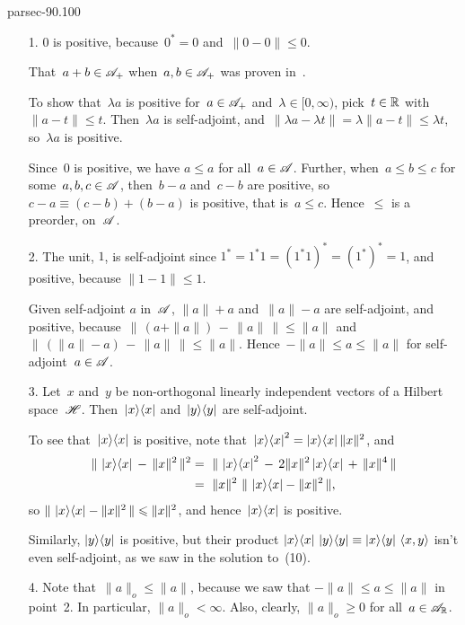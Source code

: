 \documentclass[b5page]{book}
\begin{document}
\begin{solution}{parsec-90.100}
\begin{enumerate}
\item[1.]
$0$ is positive, because~$0^*=0$ and~$\|0-0\|\leq 0$.

That~$a+b\in\mathscr{A}_+$ when~$a,b\in\mathscr{A}_+$
was proven in~.

To show that~$\lambda a$ is positive
for~$a\in\mathscr{A}_+$ and~$\lambda\in[0,\infty)$,
pick~$t\in \mathbb{R}$ with~$\|a-t\|\leq t $.
Then~$\lambda a$ is self-adjoint,
        and~$\|\lambda a -\lambda t\| = \lambda \|a-t\|\leq  \lambda t$,
so~$\lambda a$ is positive.

Since~$0$ is positive,
we have $a\leq a$ for all~$a\in\mathscr{A}$.
Further, when~$a\leq b\leq c$ for some~$a,b,c\in\mathscr{A}$,
then~$b-a$ and~$c-b$ are positive,
so~$c-a\equiv (c-b)+(b-a)$
    is positive,
        that is~$a\leq c$.
Hence~$\leq$ is a preorder, on~$\mathscr{A}$.

\item[2.]
The unit, $1$, is self-adjoint since
$1^*=1^*1 = (1^*1)^* = (1^*)^*=1$,
and positive, because $\|1-1\|\leq 1$.

Given self-adjoint $a$ in~$\mathscr{A}$,
$\|a\|+a$ and~$\|a\|-a$ are self-adjoint,
and positive,
because~$\|\,(a+\|a\|)\,-\,\|a\|\,\|\leq\|a\|$
        and $\|\,(\|a\|-a)\,-\,\|a\|\,\|\leq \|a\|$.
    Hence~$-\|a\|\leq a \leq \|a\|$
        for self-adjoint~$a\in\mathscr{A}$.

\item[3.]
Let~$x$ and~$y$ be non-orthogonal linearly independent
vectors of a Hilbert space~$\mathscr{H}$.
        Then~$\left|x\right>\!\left<x\right|$ and~$\left|y\right>\!\left<y\right|$ are self-adjoint.

To see that~$\left|x\right>\!\left<x\right|$ is positive,
note that~$\left|x\right>\!\left<x\right|^2 = \left|x\right>\!\left<x\right|\|x\|^2$,
and   
\begin{alignat*}{3}
    \|\,\left|x\right>\!\left<x\right|\,-\,\|x\|^2\,\|^2
        &=\  \|\,\left|x\right>\!\left<x\right|^2 
        \,-\, 2\|x\|^2\left|x\right>\!\left<x\right|\,+\,\|x\|^4\,\|\\
        \ &=\  \|x\|^2 \ \|\,\left|x\right>\!\left<x\right|-\|x\|^2\,\|,
\end{alignat*}
        so $\|\,\left|x\right>\!\left<x\right|-\|x\|^2\,\| \leqslant \|x\|^2$,
        and hence~$\left|x\right>\!\left<x\right|$ is positive.

Similarly, $\left|y\right>\!\left<y\right|$ is positive,
but their product
$\left|x\right>\!\left<x\right|\,\left|y\right>\!\left<y\right| 
\equiv \left|x\right>\!\left<y\right|\,\left<x,y \right>$
isn't even self-adjoint,
        as we saw in 
        the solution to~(10).
\item[4.]
Note that~$\|a\|_o\leq \|a\|$, because
we saw that $-\|a\|\leq a \leq \|a\|$ in point~2.
In particular, $\|a\|_o < \infty$.
Also, clearly, $\|a\|_o\geq 0$ for all~$a\in\mathscr{A}_{\mathbb{R}}$.


\end{enumerate}
\end{solution}
\end{document}
